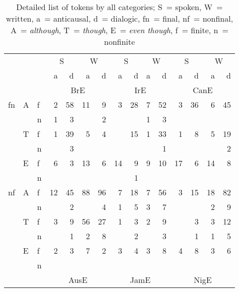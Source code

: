 \begin{table}
\caption{\label{tab:A5}Detailed list of tokens by all categories; S~= spoken, W~= written, a~= anticausal, d~= dialogic, fn~= final, nf~= nonfinal, A~= \textit{although}, T~= \textit{though}, E~= \textit{even though}, f~= finite, n~= nonfinite}
\footnotesize
\begin{tabular}{lll *{12}{r}}
\lsptoprule
&  &  & \multicolumn{2}{c}{S} &  \multicolumn{2}{c}{W}  & \multicolumn{2}{c}{S} & \multicolumn{2}{c}{W} & \multicolumn{2}{c}{S} & \multicolumn{2}{c}{W}\\\cmidrule(lr){4-5}\cmidrule(lr){6-7}\cmidrule(lr){8-9}\cmidrule(lr){10-11}\cmidrule(lr){12-13}\cmidrule(lr){14-15}
&  &  & a & d & a & d & a & d & a & d & a & d & a & d\\\cmidrule(lr){4-15}
&  &  & \multicolumn{4}{c}{BrE} & \multicolumn{4}{c}{IrE} &  \multicolumn{4}{c}{CanE}\\\cmidrule(lr){4-7}\cmidrule(lr){8-11}\cmidrule(lr){12-15}
fn & A & f & 2  & 58 & 11 & 9  & 3  & 28  & 7   & 52 & 3  & 36 & 6  & 45\\
    &              & n & 1  & 3  &    & 2  &    &     & 1   & 3  &    &    &    & \\
    & T & f & 1  & 39 & 5  & 4  &    & 15  & 1   & 33 & 1  & 8  & 5  & 19\\
    &              & n &    & 3  &    &    &    &     &     & 1  &    &    &    & 2\\
    & E & f & 6  & 3  & 13 & 6  & 14 & 9   & 9   & 10 & 17 & 6  & 14 & 8\\
    &              & n &    &    &    &    &    & 1   &     &    &    &    &    & \\
nf & A  & f & 12 & 45 & 88 & 96 & 7  & 18  & 7  & 56 & 3  & 15 & 18  & 82\\
   &               & n &    & 2  &    & 4  & 1  & 5   & 3  & 7  &    &    & 2   & 9\\
   & T  & f & 3  & 9  & 56 & 27 & 1  & 3   & 2  & 9  &    & 3  & 3   & 12\\
   &               & n &    & 1  & 2  & 8  &    & 2   &    & 3  &    & 1  & 1   & 5\\
   & E  & f & 2  & 3  & 7  & 2  & 3  & 4   & 3  & 8  & 4  & 8  & 3   & 6\\
   &               & n &    &    &    &    &    &     &    &    &    &    &     & \\
\cmidrule(lr){4-7}\cmidrule(lr){8-11}\cmidrule(lr){12-15}
& & & \multicolumn{4}{c}{AusE} & \multicolumn{4}{c}{JamE} & \multicolumn{4}{c}{NigE}\\

\end{tabular}
\end{table}
